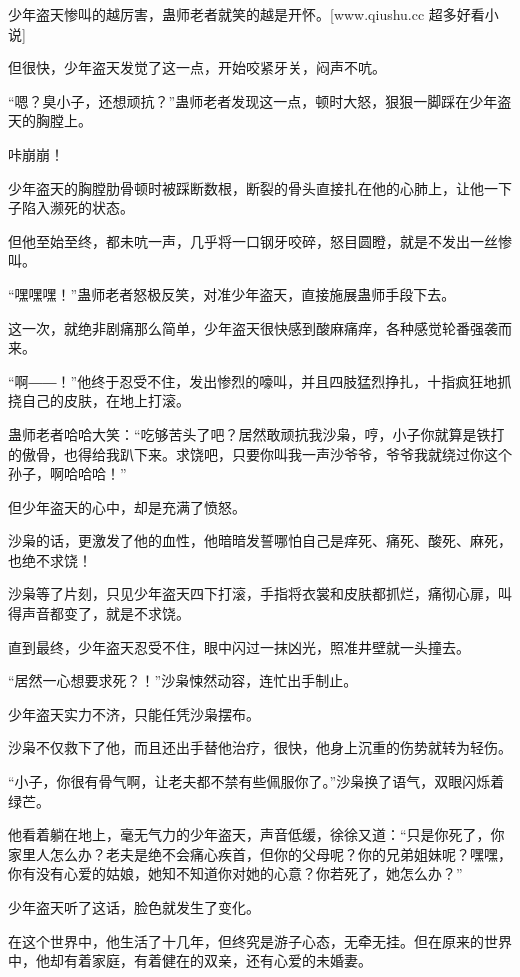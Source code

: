 
\begin{this_body}

少年盗天惨叫的越厉害，蛊师老者就笑的越是开怀。[www.qiushu.cc 超多好看小说]

但很快，少年盗天发觉了这一点，开始咬紧牙关，闷声不吭。

“嗯？臭小子，还想顽抗？”蛊师老者发现这一点，顿时大怒，狠狠一脚踩在少年盗天的胸膛上。

咔崩崩！

少年盗天的胸膛肋骨顿时被踩断数根，断裂的骨头直接扎在他的心肺上，让他一下子陷入濒死的状态。

但他至始至终，都未吭一声，几乎将一口钢牙咬碎，怒目圆瞪，就是不发出一丝惨叫。

“嘿嘿嘿！”蛊师老者怒极反笑，对准少年盗天，直接施展蛊师手段下去。

这一次，就绝非剧痛那么简单，少年盗天很快感到酸麻痛痒，各种感觉轮番强袭而来。

“啊――！”他终于忍受不住，发出惨烈的嚎叫，并且四肢猛烈挣扎，十指疯狂地抓挠自己的皮肤，在地上打滚。

蛊师老者哈哈大笑：“吃够苦头了吧？居然敢顽抗我沙枭，哼，小子你就算是铁打的傲骨，也得给我趴下来。求饶吧，只要你叫我一声沙爷爷，爷爷我就绕过你这个孙子，啊哈哈哈！”

但少年盗天的心中，却是充满了愤怒。

沙枭的话，更激发了他的血性，他暗暗发誓哪怕自己是痒死、痛死、酸死、麻死，也绝不求饶！

沙枭等了片刻，只见少年盗天四下打滚，手指将衣裳和皮肤都抓烂，痛彻心扉，叫得声音都变了，就是不求饶。

直到最终，少年盗天忍受不住，眼中闪过一抹凶光，照准井壁就一头撞去。

“居然一心想要求死？！”沙枭悚然动容，连忙出手制止。

少年盗天实力不济，只能任凭沙枭摆布。

沙枭不仅救下了他，而且还出手替他治疗，很快，他身上沉重的伤势就转为轻伤。

“小子，你很有骨气啊，让老夫都不禁有些佩服你了。”沙枭换了语气，双眼闪烁着绿芒。

他看着躺在地上，毫无气力的少年盗天，声音低缓，徐徐又道：“只是你死了，你家里人怎么办？老夫是绝不会痛心疾首，但你的父母呢？你的兄弟姐妹呢？嘿嘿，你有没有心爱的姑娘，她知不知道你对她的心意？你若死了，她怎么办？”

少年盗天听了这话，脸色就发生了变化。

在这个世界中，他生活了十几年，但终究是游子心态，无牵无挂。但在原来的世界中，他却有着家庭，有着健在的双亲，还有心爱的未婚妻。


\end{this_body}
